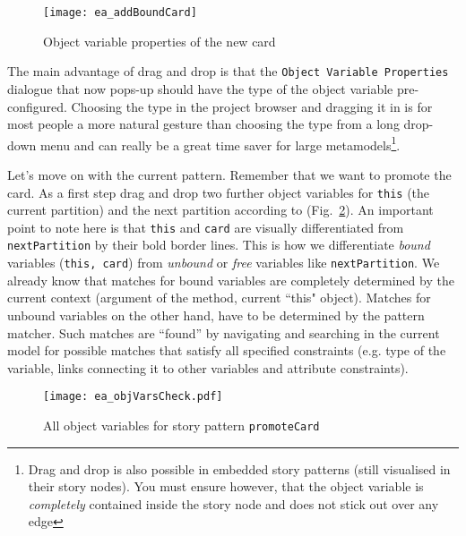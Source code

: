 \begin{figure}[htbp]
\begin{center}
  \texttt{[image: ea\_addBoundCard]}
  \caption{Object variable properties of the new card}
  \label{fig:sdm_new_card_properties}
\end{center}
\end{figure}

The main advantage of drag and drop is that the \texttt{Object Variable Pro\-per\-ties} dialogue that now pops-up should have the type of the object variable
pre-configured. Choosing the type in the project browser and dragging it in is for most people a more natural gesture than choosing the type from a long
drop-down menu and can really be a great time saver for large metamodels\footnote{Drag and drop is also possible in embedded story patterns (still visualised in
their story nodes).  You must ensure however, that the object variable is \emph{completely} contained inside the story node and does not stick out over any
edge}.

Let's move on with the current pattern. Remember that we want to promote the card. As a first step drag and drop two further object variables for \texttt{this}
(the current partition) and the next partition according to (Fig.~\ref{fig:sdm_check_complete_sp}). An important point to note here is that \texttt{this} and
\texttt{card} are visually differentiated from \texttt{nextPartition} by their bold border lines.
This is how we differentiate \emph{bound}  variables (\texttt{this, card}) from \emph{unbound} or \emph{free} variables like
\texttt{nextPartition}. We already know that matches for bound variables are completely determined by the current context (argument of the method, current
``this" object).
Matches for unbound variables on the other hand, have to be determined by the pattern matcher. Such matches are ``found'' by navigating and searching in the
current model for possible matches that satisfy all specified constraints (e.g. type of the variable, links connecting it to other variables and attribute
constraints).

\begin{figure}[htbp]
\begin{center}
  \texttt{[image: ea\_objVarsCheck.pdf]}
  \caption{All object variables for story pattern \texttt{promoteCard}}
  \label{fig:sdm_check_complete_sp}
\end{center}
\end{figure}

